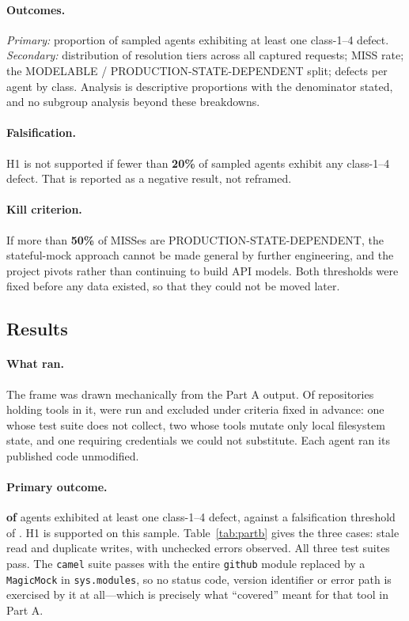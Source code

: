 \documentclass[11pt]{article}
\begin{document}
\paragraph{Outcomes.} \emph{Primary:} proportion of sampled agents exhibiting at least
one class-1--4 defect. \emph{Secondary:} distribution of resolution tiers across all
captured requests; MISS rate; the MODELABLE / PRODUCTION-STATE-DEPENDENT split; defects
per agent by class. Analysis is descriptive proportions with the denominator stated, and
no subgroup analysis beyond these breakdowns.

\paragraph{Falsification.} H1 is not supported if fewer than \textbf{20\%} of sampled
agents exhibit any class-1--4 defect. That is reported as a negative result, not
reframed.

\paragraph{Kill criterion.} If more than \textbf{50\%} of MISSes are
PRODUCTION-STATE-DEPENDENT, the stateful-mock approach cannot be made general by further
engineering, and the project pivots rather than continuing to build API models. Both
thresholds were fixed before any data existed, so that they could not be moved later.

\subsection{Results}
\label{sec:partb-results}

\paragraph{What ran.} The frame was drawn mechanically from the Part A output. Of
\BbFrameAgents{} repositories holding tools in it, \BbAgentsRun{} were run and
\BbExcluded{} excluded under criteria fixed in advance: one whose test suite does not
collect, two whose tools mutate only local filesystem state, and one requiring
credentials we could not substitute. Each agent ran its published code unmodified.

\paragraph{Primary outcome.} \textbf{\BbAgentsDefective{} of \BbAgentsRun{}} agents
exhibited at least one class-1--4 defect, against a falsification threshold of
\BbThresholdPct{}. H1 is supported on this sample. Table~\ref{tab:partb} gives the three
cases: \BbStaleReads{} stale read and \BbDuplicateWrites{} duplicate writes, with
\BbUncheckedErrors{} unchecked errors observed. All three test suites pass. The
\texttt{camel} suite passes with the entire \texttt{github} module replaced by a
\texttt{MagicMock} in \texttt{sys.modules}, so no status code, version identifier or
error path is exercised by it at all---which is precisely what ``covered'' meant for that
tool in Part A.
\end{document}
